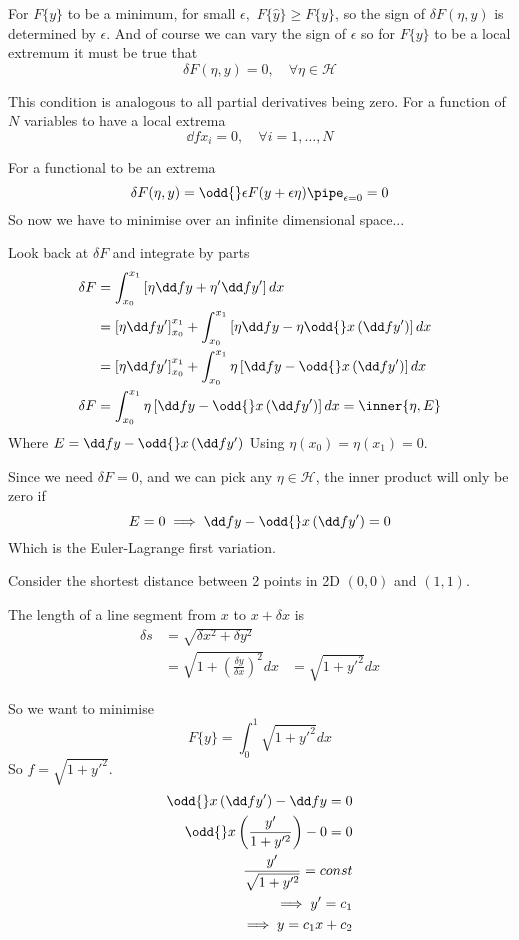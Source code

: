\documentclass{E:/Documents/Latex/myassignment}
\begin{document}
For $F\{y\}$ to be a minimum, for small $\epsilon,$ $F\{\hat{y}\} \geq F\{y\}$, so the sign of $\delta F(\eta,y)$ is determined by $\epsilon$.
And of course we can vary the sign of $\epsilon$ so for $F\{y\}$ to be a local extremum it must be true that
\[\delta F(\eta,y) = 0, \quad \forall \eta \in \mathcal{H}\]

This condition is analogous to all partial derivatives being zero. For a function of $N$ variables to have a local extrema
\[\dd f{x_i} = 0, \quad \forall i = 1,\ldots,N\]

For a functional to be an extrema 
\[\delta F(\eta,y) = \odd{}\epsilon F(y+\epsilon \eta) \pipe_{\epsilon = 0} = 0\]
So now we have to minimise over an infinite dimensional space...

Look back at $\delta F$ and integrate by parts
\begin{align*}
	\delta F &= \int_{x_0}^{x_1} \left[\eta \dd fy + \eta' \dd f{y'}\right] dx\\
	&= \left[\eta \dd f{y'}\right]_{x_0}^{x_1} + \int_{x_0}^{x_1} \left[\eta \dd fy - \eta \odd{}x \left(\dd f{y'}\right)\right]dx\\
	&= \left[\eta \dd f{y'}\right]_{x_0}^{x_1} + \int_{x_0}^{x_1} \eta\left[ \dd fy - \odd{}x \left(\dd f{y'}\right)\right]dx\\
	\delta F&= \int_{x_0}^{x_1} \eta\left[ \dd fy - \odd{}x \left(\dd f{y'}\right)\right]dx = \inner{\eta,E}\\
\end{align*}
Where $E = \dd fy - \odd{}x \left(\dd f{y'}\right)$
Using $\eta(x_0) = \eta(x_1) = 0$.

Since we need $\delta F = 0$, and we can pick any $\eta \in \mathcal{H}$, the inner product will only be zero if
\[E= 0 \implies \dd fy - \odd{}x \left(\dd f{y'}\right) = 0\]
Which is the Euler-Lagrange first variation.


Consider the shortest distance between 2 points in 2D $(0,0)$ and $(1,1)$.

The length of a line segment from $x$ to $x + \delta x$ is
\begin{align*}
	\delta s &= \sqrt{\delta x^2 + \delta y^2}\\
	&= \sqrt{1 + \left(\frac{\delta y}{\delta x}\right)^2}dx
	&= \sqrt{1 + y'^2}dx
\end{align*}

So we want to minimise
\[F\{y\} = \int_0^1 \sqrt{1+y'^2} dx\]
So $f = \sqrt{1+y'^2}$.
\begin{align*}
	\odd{}x \left(\dd f{y'}\right) - \dd fy = 0\\
	\odd{}x \left(\frac{y'}{1+y'^2}\right) - 0 =0\\
	\frac{y'}{\sqrt{1+y'^2}} = const\\
	\implies y' = c_1\\
	\implies y = c_1 x+ c_2
\end{align*}
\end{document}
